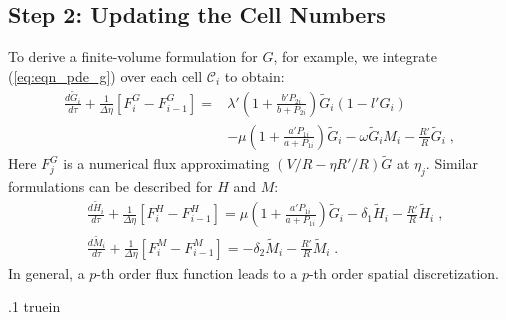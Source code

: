 \documentclass{amsart}
\theoremstyle{definition}
\theoremstyle{remark}
\numberwithin{equation}{section}
\numberwithin{figure}{section}
\begin{document}
\subsection{Step 2: Updating the Cell Numbers}
To derive a finite-volume formulation for $G$, for example, we integrate (\ref{eq:eqn_pde_g}) over each cell $\mathcal{C}_i$ to obtain:
\begin{align*}
\frac{d\tilde{G}_i}{d\tau} + \frac{1}{\Delta\eta}\left[F^G_{i}-F^G_{i-1}\right] =& 
     \lambda'\left(1+\frac{b'P_{2i}}{b+P_{2i}}\right)\tilde{G}_i\left(1-l'G_i\right)\\
    &-\mu\left(1+\frac{a'P_{1i}}{a+P_{1i}}\right)\tilde{G}_i-\omega\tilde{G}_iM_i-\frac{R'}{R}\tilde{G}_i\;,
\end{align*}
Here $F_j^G$ is a numerical flux approximating $(V/R-\eta R'/R)\tilde{G}$ at $\eta_j$.
Similar formulations can be described for $H$ and $M$:
\begin{align*}
&\frac{d\tilde{H}_i}{d\tau} + \frac{1}{\Delta\eta}\left[F^H_{i}-F^H_{i-1}\right] = \mu\left(1+\frac{a'P_{1i}}{a+P_{1i}}\right)\tilde{G}_i-\delta_1\tilde{H}_i-\frac{R'}{R}\tilde{H}_i\;,\\
&\frac{d\tilde{M}_i}{d\tau} + \frac{1}{\Delta\eta}\left[F^M_{i}-F^M_{i-1}\right] = -\delta_2\tilde{M}_i-\frac{R'}{R}\tilde{M}_i\;.
\end{align*}
In general, a $p$-th order flux function leads to a $p$-th order spatial discretization.

\vglue .1 truein
\end{document}
